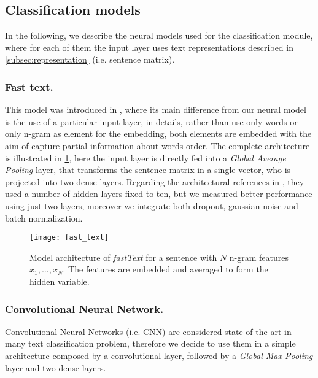 \subsection{Classification models} \label{subsec:classificationModel}
In the following, we describe the neural models used for the classification module, where for each of them the input layer uses text representations described in \cref{subsec:representation} (i.e. sentence matrix).


\subsubsection{Fast text.}
This model was introduced in \cite{joulin2016bag}, where its main difference from our neural model is the use of a particular input layer, in details, rather than use only words or only n-gram as element for the embedding, both elements are embedded with the aim of capture partial information about words order.
The complete architecture is illustrated in \cref{fig:fastText}, here the input layer is directly fed into a \emph{Global Average Pooling} layer, that transforms the sentence matrix in a single vector, who is projected into two dense layers.
Regarding the architectural references in \cite{joulin2016bag}, they used a number of hidden layers fixed to ten, but we measured better performance using just two layers, moreover we integrate both dropout, gaussian noise and batch normalization.

\begin{figure}[h]
\footnotesize
\centering
\texttt{[image: fast\_text]}
\caption{\cite{joulin2016bag} Model architecture of \emph{fastText} for a sentence with $N$ n-gram features $x_1,\dots,x_N$. The features are embedded and averaged to form the hidden variable.}
\label{fig:fastText}
\end{figure}


\subsubsection{Convolutional Neural Network.}
Convolutional Neural Networks (i.e. CNN) are considered state of the art in many text classification problem, therefore we decide to use them in a simple architecture composed by a convolutional layer, followed by a \emph{Global Max Pooling} layer and two dense layers.

